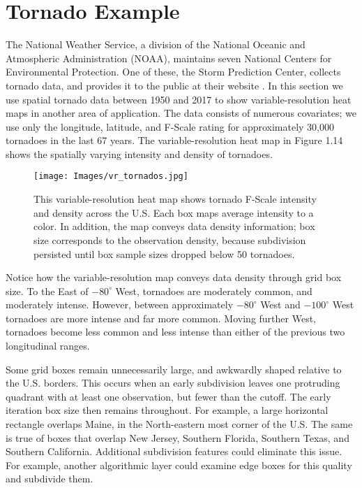 
\section{Tornado Example}

The National Weather Service, a division of the National Oceanic and Atmospheric Administration (NOAA), maintains seven National Centers for Environmental Protection. One of these, the Storm Prediction Center, collects tornado data, and provides it to the public at their website \citep{NOAA}. In this section we use spatial tornado data between 1950 and 2017 to show variable-resolution heat maps in another area of application. The data consists of numerous covariates; we use only the longitude, latitude, and F-Scale rating for approximately 30,000 tornadoes in the last 67 years. The variable-resolution heat map in Figure 1.14 shows the spatially varying intensity and density of tornadoes.
        \begin{figure}[H]
      	\centering      
      	\texttt{[image: Images/vr\_tornados.jpg]}
      	\caption{This variable-resolution heat map shows tornado F-Scale intensity and density across the U.S. Each box maps average intensity to a color. In addition, the map conveys data density information; box size corresponds to the observation density, because subdivision persisted until box sample sizes dropped below 50 tornadoes.}
        \end{figure}
Notice how the variable-resolution map conveys data density through grid box size. To the East of $-80^{\circ}$ West, tornadoes are moderately common, and moderately intense. However, between approximately $-80^{\circ}$ West and $-100^{\circ}$ West tornadoes are more intense and far more common. Moving further West, tornadoes become less common and less intense than either of the previous two longitudinal ranges.

Some grid boxes remain unnecessarily large, and awkwardly shaped relative to the U.S. borders. This occurs when an early subdivision leaves one protruding quadrant with at least one observation, but fewer than the cutoff. The early iteration box size then remains throughout. For example, a large horizontal rectangle overlaps Maine, in the North-eastern most corner of the U.S. The same is true of boxes that overlap New Jersey, Southern Florida, Southern Texas, and Southern California. Additional subdivision features could eliminate this issue. For example, another algorithmic layer could examine edge boxes for this quality and subdivide them.

